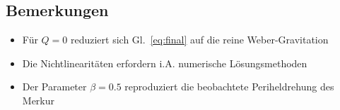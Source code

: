 \subsection{Bemerkungen}
\begin{itemize}
\item Für \( Q = 0 \) reduziert sich Gl.~\eqref{eq:final} auf die reine Weber-Gravitation
\item Die Nichtlinearitäten erfordern i.A. numerische Lösungsmethoden
\item Der Parameter \( \beta = 0.5 \) reproduziert die beobachtete Periheldrehung des Merkur
\end{itemize}
